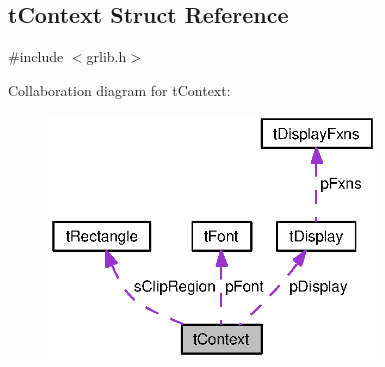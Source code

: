 \subsection{t\+Context Struct Reference}
\label{structt_context}


{\ttfamily \#include $<$grlib.\+h$>$}



Collaboration diagram for t\+Context\+:
\nopagebreak
\begin{figure}[H]
\begin{center}
\leavevmode
\includegraphics[width=247pt]{structt_context__coll__graph}
\end{center}
\end{figure}

